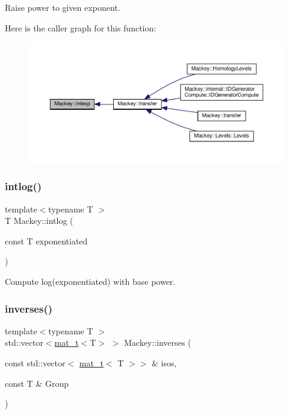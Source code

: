 Raise power to given exponent. 

Here is the caller graph for this function\+:\nopagebreak
\begin{figure}[H]
\begin{center}
\leavevmode
\includegraphics[width=350pt]{namespaceMackey_a4904fdc0fdcf3c23d7f3b80f59b2eafa_icgraph}
\end{center}
\end{figure}
\mbox{\label{namespaceMackey_aa0cac9097035c5fe8448742e22e6f78b}} 
\subsubsection{\texorpdfstring{intlog()}{intlog()}}
{\footnotesize\ttfamily template$<$typename T $>$ \\
T Mackey\+::intlog (\begin{DoxyParamCaption}\item[{const T}]{exponentiated }\end{DoxyParamCaption})\hspace{0.3cm}{\ttfamily [inline]}}



Compute log(exponentiated) with base power. 

\mbox{\label{namespaceMackey_a8c1525b210b4699780bbe05cb16f0e7b}} 
\subsubsection{\texorpdfstring{inverses()}{inverses()}}
{\footnotesize\ttfamily template$<$typename T $>$ \\
std\+::vector$<$\hyperlink{namespaceMackey_a035386035757dade630f685e508e5cf9}{mat\+\_\+t}$<$T$>$ $>$ Mackey\+::inverses (\begin{DoxyParamCaption}\item[{const std\+::vector$<$ \hyperlink{namespaceMackey_a035386035757dade630f685e508e5cf9}{mat\+\_\+t}$<$ T $>$$>$ \&}]{isos,  }\item[{const T \&}]{Group }\end{DoxyParamCaption})}



